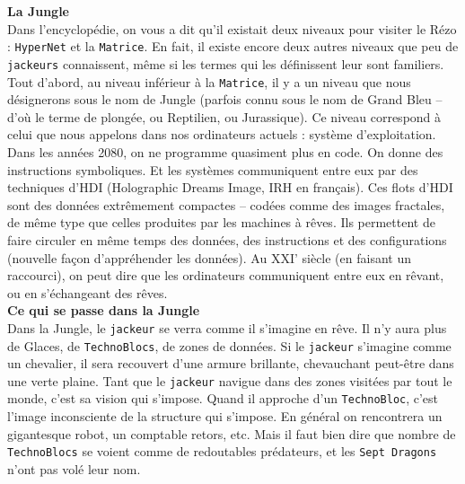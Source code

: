 \documentclass[11pt,twoside,a4paper]{article}
\begin{document}
\begin{multicols}{3}
\scriptsize{

	\textbf{\Large La Jungle}~\\
	
	Dans l'encyclop{\'e}die, on vous a dit qu'il existait deux niveaux pour visiter le R{\'e}zo : \texttt{HyperNet} et la \texttt{Matrice}. En fait, il existe encore deux autres niveaux que peu de \texttt{jackeurs} connaissent, m{\^e}me si les termes qui les d{\'e}finissent leur sont familiers.~\\
	
	Tout d'abord, au niveau inf{\'e}rieur {\`a} la \texttt{Matrice}, il y a un niveau que nous d{\'e}signerons sous le nom de Jungle (parfois connu sous le nom de Grand Bleu -- d'o{\`u} le terme de plong{\'e}e, ou Reptilien, ou Jurassique). Ce niveau correspond {\`a} celui que nous appelons dans nos ordinateurs actuels : syst{\`e}me d'exploitation. Dans les ann{\'e}es 2080, on ne programme quasiment plus en code. On donne des instructions symboliques. Et les syst{\`e}mes communiquent entre eux par des techniques d'HDI (Holographic Dreams Image, IRH en fran\c{c}ais). Ces flots d'HDI sont des donn{\'e}es extr{\^e}mement compactes -- cod{\'e}es comme des images fractales, de m{\^e}me type que celles produites par les machines {\`a} r{\^e}ves. Ils permettent de faire circuler en m{\^e}me temps des donn{\'e}es, des instructions et des configurations (nouvelle fa\c{c}on d'appr{\'e}hender les donn{\'e}es). Au XXI' si{\`e}cle (en faisant un raccourci), on peut dire que les ordinateurs communiquent entre eux en r{\^e}vant, ou en s'{\'e}changeant des r{\^e}ves.~\\
	
	\textbf{\large Ce qui se passe dans la Jungle}~\\
	
	Dans la Jungle, le \texttt{jackeur} se verra comme il s'imagine en r{\^e}ve. Il n'y aura plus de Glaces, de \texttt{TechnoBlocs}, de zones de donn{\'e}es. Si le \texttt{jackeur} s'imagine comme un chevalier, il sera recouvert d'une armure brillante, chevauchant peut-{\^e}tre dans une verte plaine. Tant que le \texttt{jackeur} navigue dans des zones visit{\'e}es par tout le monde, c'est sa vision qui s'impose. Quand il approche d'un \texttt{TechnoBloc}, c'est l'image inconsciente de la structure qui s'impose. En g{\'e}n{\'e}ral on rencontrera un gigantesque robot, un comptable retors, etc. Mais il faut bien dire que nombre de \texttt{TechnoBlocs} se voient comme de redoutables pr{\'e}dateurs, et les \texttt{Sept Dragons} n'ont pas vol{\'e} leur nom.~\\
	
}
\end{multicols}
\end{document}
